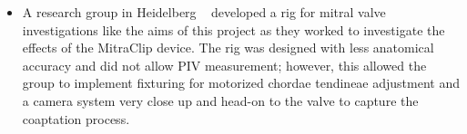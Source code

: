 \begin{itemize}
    \item A research group in Heidelberg ~ developed a rig for mitral valve investigations like the aims of this project as they worked to investigate the effects of the MitraClip device. The rig was designed with less anatomical accuracy and did not allow \gls{PIV} measurement; however, this allowed the group to implement fixturing for motorized chordae tendineae adjustment and a camera system very close up and head-on to the valve to capture the coaptation process.
          \marginpar{
              \centering
              \footnotesize
}
\end{itemize}
